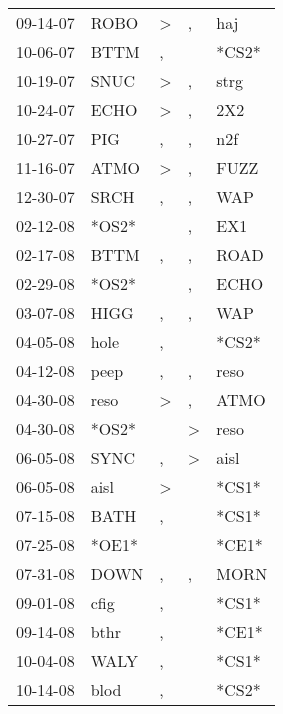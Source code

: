\begin{supertabular}{lllll}
 09-14-07 &   ROBO &     \textgreater &                , &    haj \\
 10-06-07 &   BTTM &                , &                  &  *CS2* \\
 10-19-07 &   SNUC &     \textgreater &                , &   strg \\
 10-24-07 &   ECHO &     \textgreater &                , &    2X2 \\
 10-27-07 &    PIG &                , &                , &    n2f \\
 11-16-07 &   ATMO &     \textgreater &                , &   FUZZ \\
 12-30-07 &   SRCH &                , &                , &    WAP \\
 02-12-08 &  *OS2* &                  &                , &    EX1 \\
 02-17-08 &   BTTM &                , &                , &   ROAD \\
 02-29-08 &  *OS2* &                  &                , &   ECHO \\
 03-07-08 &   HIGG &                , &                , &    WAP \\
 04-05-08 &   hole &                , &                  &  *CS2* \\
 04-12-08 &   peep &                , &                , &   reso \\
 04-30-08 &   reso &     \textgreater &                , &   ATMO \\
 04-30-08 &  *OS2* &                  &     \textgreater &   reso \\
 06-05-08 &   SYNC &                , &     \textgreater &   aisl \\
 06-05-08 &   aisl &     \textgreater &                  &  *CS1* \\
 07-15-08 &   BATH &                , &                  &  *CS1* \\
 07-25-08 &  *OE1* &                  &                  &  *CE1* \\
 07-31-08 &   DOWN &                , &                , &   MORN \\
 09-01-08 &   cfig &                , &                  &  *CS1* \\
 09-14-08 &   bthr &                , &                  &  *CE1* \\
 10-04-08 &   WALY &                , &                  &  *CS1* \\
 10-14-08 &   blod &                , &                  &  *CS2* \\

\end{supertabular}
